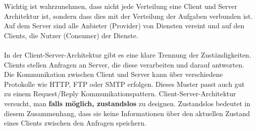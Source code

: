 \documentclass[../vs-script-first-v01.tex]{subfiles}
\begin{document}
Wichtig ist wahrzunehmen, dass nicht jede Verteilung eine Client und Server Architektur ist, sondern dass dies mit der Verteilung der Aufgaben verbunden ist. Auf dem Server sind alle Anbieter (Provider) von Diensten vereint und auf den Clients, die Nutzer (Consumer) der Dienste. 
\\\\
In der Client-Server-Architektur gibt es eine klare Trennung der Zuständigkeiten. Clients stellen Anfragen an Server, die diese verarbeiten und darauf antworten. Die Kommunikation zwischen Client und Server kann über verschiedene Protokolle wie HTTP, FTP oder SMTP erfolgen. Dieses Muster passt auch gut zu einem Request/Reply Kommunikationspattern. 
Client-Server-Architektur versucht, man \textbf{falls möglich, zustandslos} zu designen. Zustandslos bedeutet in diesem Zusammenhang, dass sie keine Informationen über den aktuellen Zustand eines Clients zwischen den Anfragen speichern. 

\end{document}
